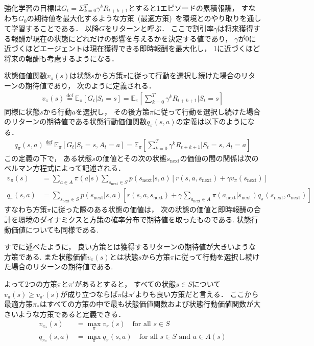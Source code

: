 強化学習の目標は$G_t=\Sigma_{k=0}^T \gamma^k R_{t+k+1}$とすると1エピソードの累積報酬， すなわち$G_0$の期待値を最大化するような方策~(最適方策)~を環境とのやり取りを通して学習することである．
以降$G$をリターンと呼ぶ．
ここで割引率$\gamma$は将来獲得する報酬が現在の状態にどれだけの影響を与えるかを決定する値であり， $\gamma$が0に近づくほどエージェントは現在獲得できる即時報酬を最大化し， 1に近づくほど将来の報酬も考慮するようになる．

状態価値関数$v_{\pi}(s)$は状態$s$から方策$\pi$に従って行動を選択し続けた場合のリターンの期待値であり， 次のように定義される．
\begin{align}
  v_{\pi}(s) \stackrel{\mathrm{def}}{=} \mathbb{E}_{\pi}\left[G_t|S_t=s \right] = \mathbb{E}_{\pi}\left[\sum_{k=0}^T \gamma^k R_{t+k+1}|S_t=s \right]
\end{align}
同様に状態$s$から行動$a$を選択し， その後方策$\pi$に従って行動を選択し続けた場合のリターンの期待値である状態行動価値関数$q_{\pi}(s,a)$の定義は以下のようになる．
\begin{align}
  q_{\pi}(s,a) \stackrel{\mathrm{def}}{=} \mathbb{E}_{\pi}[G_t|S_t=s, A_t=a] = \mathbb{E}_{\pi}\left[\sum_{k=0}^T \gamma^k R_{t+k+1}|S_t=s, A_t=a \right]
\end{align}
この定義の下で， ある状態$s$の価値とその次の状態$s_{\text{next}}$の価値の間の関係は次のベルマン方程式によって記述される．
\begin{align}
  v_{\pi}(s) &= \sum_{a \in A} \pi(a|s) \sum_{s_{\text{next}} \in S} p(s_{\text{next}}|s,a)[r(s,a,s_{\text{next}}) + \gamma v_{\pi}(s_{\text{next}})] \\
  q_{\pi}(s,a) &= \sum_{s_{\text{next}} \in S} p(s_{\text{next}}|s,a)\left[r(s,a,s_{\text{next}}) + \gamma \sum_{a_{\text{next}} \in A} \pi(a_{\text{next}}|s_{\text{next}})q_{\pi}(s_{\text{next}}, a_{\text{next}})\right]
\end{align}
すなわち方策$\pi$に従った際のある状態の価値は， 次の状態の価値と即時報酬の合計を環境のダイナミクスと方策の確率分布で期待値を取ったものである. 
状態行動価値についても同様である.

すでに述べたように， 良い方策とは獲得するリターンの期待値が大きいような方策である.
また状態価値$v_\pi(s)$とは状態$s$から方策$\pi$に従って行動を選択し続けた場合のリターンの期待値である.

よって2つの方策$\pi$と$\pi'$があるとすると， すべての状態$s \in S$について$v_\pi(s) \geq v_{\pi'}(s)$が成り立つならば$\pi$は$\pi'$よりも良い方策だと言える．
ここから最適方策$\pi_*$はすべての方策の中で最も状態価値関数および状態行動価値関数が大きいような方策であると定義できる．
\begin{align}
  \label{eq:v_max}
  v_{\pi_*}(s) &= \max_\pi v_{\pi}(s) \quad \text{for all } s \in S \\
  \label{eq:q_max}
  q_{\pi_*}(s,a) &= \max_\pi q_{\pi}(s, a) \quad \text{for all } s \in S \text{ and } a \in A(s)
\end{align}

